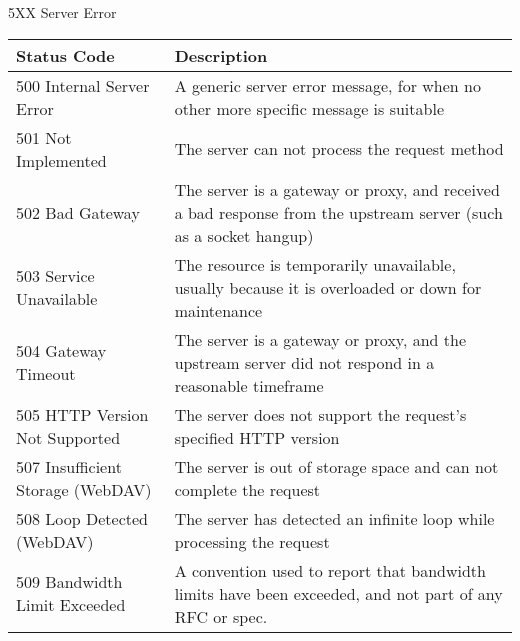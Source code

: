 \documentclass[final,table]{beamer}
\begin{document}
\begin{frame}{}
\begin{block}{\huge 5XX Server Error}
      \begin{tabular}{p{} p{}}
        Status Code & Description \\ \hline
        500 Internal Server Error & A generic server error message, for when no other more specific message is suitable \\
        501 Not Implemented & The server can not process the request method \\
        502 Bad Gateway & The server is a gateway or proxy, and received a bad response from the upstream server (such as a socket hangup) \\
        503 Service Unavailable & The resource is temporarily unavailable, usually because it is overloaded or down for maintenance \\
        504 Gateway Timeout & The server is a gateway or proxy, and the upstream server did not respond in a reasonable timeframe \\
        505 HTTP Version Not Supported & The server does not support the request's specified HTTP version \\
        507 Insufficient Storage (WebDAV) & The server is out of storage space and can not complete the request \\
        508 Loop Detected (WebDAV) & The server has detected an infinite loop while processing the request \\
        509 Bandwidth Limit Exceeded & A convention used to report that bandwidth limits have been exceeded, and not part of any RFC or spec. \\
      \end{tabular}
    \end{block}
  \end{frame}
\end{document}
